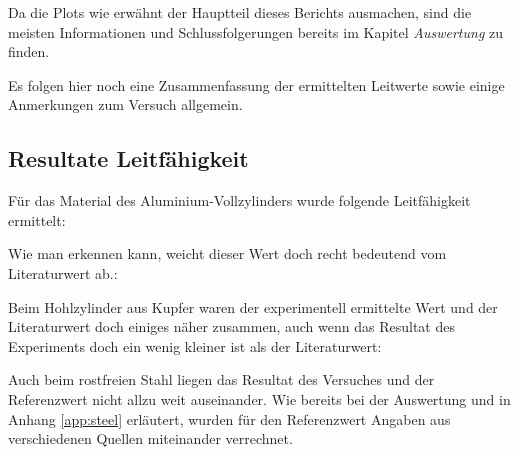 Da  die  Plots   wie  erw\"ahnt  der  Hauptteil   dieses  Berichts  ausmachen,
sind  die  meisten Informationen  und  Schlussfolgerungen  bereits im  Kapitel
\emph{Auswertung} zu finden.

Es  folgen hier  noch  eine Zusammenfassung  der  ermittelten Leitwerte  sowie
einige Anmerkungen zum Versuch allgemein.


\subsection{Resultate Leitf\"ahigkeit}
\label{sec:results:subsec:sigma}

F\"ur das Material des  Aluminium-Vollzylinders wurde folgende Leitf\"ahigkeit
ermittelt:


Wie  man  erkennen   kann,  weicht  dieser  Wert  doch   recht  bedeutend  vom
Literaturwert ab.:

\vspace{1em}
\begin{center}
    
\end{center}
\vspace{1em}

Beim Hohlzylinder aus  Kupfer waren der experimentell ermittelte  Wert und der
Literaturwert  doch  einiges n\"aher  zusammen,  auch  wenn das  Resultat  des
Experiments doch ein wenig kleiner ist als der Literaturwert:


\vspace{1em}
\begin{center}
    
\end{center}
\vspace{1em}

Auch  beim  rostfreien  Stahl  liegen  das  Resultat  des  Versuches  und  der
Referenzwert nicht allzu weit auseinander. Wie  bereits bei der Auswertung und
in Anhang  \ref{app:steel} erl\"autert, wurden f\"ur  den Referenzwert Angaben
aus verschiedenen Quellen miteinander verrechnet.


\vspace{1em}
\begin{center}
    
\end{center}
\vspace{1em}

